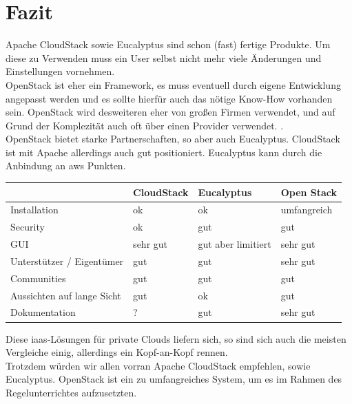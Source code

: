 \documentclass[a4paper,nochapterprefix,english,12pt]{scrreprt}
\begin{document}
\chapter{Fazit} \thispagestyle{fancy}
Apache CloudStack sowie Eucalyptus sind schon (fast) fertige Produkte. Um diese zu Verwenden muss ein User selbst nicht mehr viele Änderungen und Einstellungen vornehmen.\\
OpenStack ist eher ein Framework, es muss eventuell durch eigene Entwicklung angepasst werden und es sollte hierfür auch das nötige Know-How vorhanden sein.\cite{OSundAVerg} OpenStack wird desweiteren eher von großen Firmen verwendet, und auf Grund der Komplezität auch oft über einen Provider verwendet. \cite{allthreeverg}. \\
OpenStack bietet starke Partnerschaften, so aber auch Eucalyptus. CloudStack ist mit Apache allerdings auch gut positioniert. Eucalyptus kann durch die Anbindung an \gls{aws} Punkten.
\begin{table}[h]
\begin{tabular}{|p{}|p{}|p{}|p{}|}
\hline
 & \textbf{CloudStack} & \textbf{Eucalyptus} & \textbf{Open Stack} \\ \hline
Installation  &  ok  & ok & umfangreich   \\
Security  & ok & gut &         gut            \\ 
GUI  &  sehr gut  & gut aber limitiert&      sehr gut          \\ 
Unterstützer / Eigentümer  & gut & gut & sehr gut \\ 
Communities  & gut & gut & gut  \\ 
Aussichten auf lange Sicht  & gut & ok & gut \\ 
Dokumentation & ? & gut &  sehr gut \\ 
\hline
\end{tabular}
\end{table}
\FloatBarrier
Diese \gls{iaas}-Lösungen für private Clouds liefern sich, so sind sich auch die meisten Vergleiche einig, allerdings ein Kopf-an-Kopf rennen. \\
Trotzdem würden wir allen vorran Apache CloudStack empfehlen, sowie Eucalyptus. \cite{allthreeverg}
OpenStack ist ein zu umfangreiches System, um es im Rahmen des Regelunterrichtes aufzusetzten.




 


 \thispagestyle{fancy}
 \thispagestyle{fancy}

\printglossary[style=tree,title={Glossar}]  \thispagestyle{fancy}

\label{lastpage}
\end{document}
